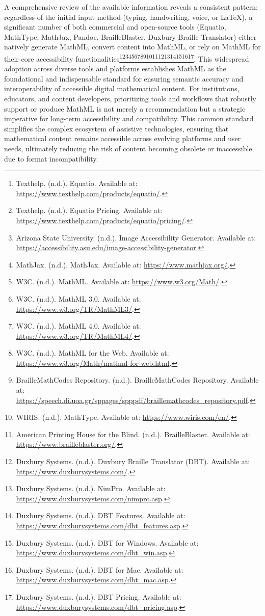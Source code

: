 A comprehensive review of the available information reveals a consistent pattern: regardless of the initial input method (typing, handwriting, voice, or LaTeX), a significant number of both commercial and open-source tools (Equatio, MathType, MathJax, Pandoc, BrailleBlaster, Duxbury Braille Translator) either natively generate MathML, convert content into MathML, or rely on MathML for their core accessibility functionalities\footnote{Texthelp. (n.d.). Equatio. Available at: \url{https://www.texthelp.com/products/equatio/}.}\footnote{Texthelp. (n.d.). Equatio Pricing. Available at: \url{https://www.texthelp.com/products/equatio/pricing/}.}\footnote{Arizona State University. (n.d.). Image Accessibility Generator. Available at: \url{https://accessibility.asu.edu/image-accessibility-generator}.}\footnote{MathJax. (n.d.). MathJax. Available at: \url{https://www.mathjax.org/}.}\footnote{W3C. (n.d.). MathML. Available at: \url{https://www.w3.org/Math/}.}\footnote{W3C. (n.d.). MathML 3.0. Available at: \url{https://www.w3.org/TR/MathML3/}.}\footnote{W3C. (n.d.). MathML 4.0. Available at: \url{https://www.w3.org/TR/MathML4/}.}\footnote{W3C. (n.d.). MathML for the Web. Available at: \url{https://www.w3.org/Math/mathml-for-web.html}.}\footnote{BrailleMathCodes Repository. (n.d.). BrailleMathCodes Repository. Available at: \url{https://speech.di.uoa.gr/sppages/spppdf/braillemathcodes_repository.pdf}.}\footnote{WIRIS. (n.d.). MathType. Available at: \url{https://www.wiris.com/en/}.}\footnote{American Printing House for the Blind. (n.d.). BrailleBlaster. Available at: \url{https://www.brailleblaster.org/}.}\footnote{Duxbury Systems. (n.d.). Duxbury Braille Translator (DBT). Available at: \url{https://www.duxburysystems.com/}.}\footnote{Duxbury Systems. (n.d.). NimPro. Available at: \url{https://www.duxburysystems.com/nimpro.asp}.}\footnote{Duxbury Systems. (n.d.). DBT Features. Available at: \url{https://www.duxburysystems.com/dbt_features.asp}.}\footnote{Duxbury Systems. (n.d.). DBT for Windows. Available at: \url{https://www.duxburysystems.com/dbt_win.asp}.}\footnote{Duxbury Systems. (n.d.). DBT for Mac. Available at: \url{https://www.duxburysystems.com/dbt_mac.asp}.}\footnote{Duxbury Systems. (n.d.). DBT Pricing. Available at: \url{https://www.duxburysystems.com/dbt_pricing.asp}.}. This widespread adoption across diverse tools and platforms establishes MathML as the foundational and indispensable standard for ensuring semantic accuracy and interoperability of accessible digital mathematical content. For institutions, educators, and content developers, prioritizing tools and workflows that robustly support or produce MathML is not merely a recommendation but a strategic imperative for long-term accessibility and compatibility. This common standard simplifies the complex ecosystem of assistive technologies, ensuring that mathematical content remains accessible across evolving platforms and user needs, ultimately reducing the risk of content becoming obsolete or inaccessible due to format incompatibility.

